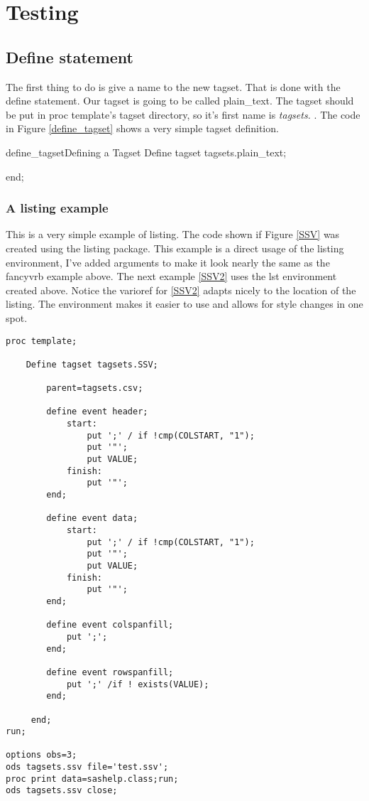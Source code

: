 \chapter{Testing }
\section{Define statement}
The first thing to do is give a name to the new tagset.  That is done 
with the define statement.  Our tagset is going to be called
plain\_text.  The tagset should be put in proc template's tagset directory,
so it's first name is {\itshape tagsets.} .
The code in Figure \vref{define_tagset}
shows a very simple tagset definition.

\begin{fvcode}{define_tagset}{Defining a Tagset}
     Define tagset tagsets.plain_text;

     end; 
\end{fvcode}

\subsection{A listing example}
This is a very simple example of listing.  The code shown if Figure \vref{SSV}
was created using the listing package.  This example is a direct usage of the
listing environment, I've added arguments to make it look nearly the same as
the fancyvrb example above.  The next example \vref{SSV2} uses the lst environment
created above.  Notice the varioref for \ref{SSV2} adapts nicely to the location
of the listing. The environment makes it easier to use and allows for style changes
in one spot.

\begin{lstlisting}[label=SSV, caption={SSV listing}, frame=lines, xleftmargin=1cm]
proc template;
    
    Define tagset tagsets.SSV;

        parent=tagsets.csv;

        define event header;
            start:
                put ';' / if !cmp(COLSTART, "1");
                put '"';
                put VALUE;
            finish:
                put '"';
        end;

        define event data;
            start:
                put ';' / if !cmp(COLSTART, "1");
                put '"';
                put VALUE;
            finish:
                put '"';
        end;

        define event colspanfill;
            put ';';
        end;    

        define event rowspanfill;
            put ';' /if ! exists(VALUE);
        end;

     end; 
run;

options obs=3;
ods tagsets.ssv file='test.ssv';
proc print data=sashelp.class;run;
ods tagsets.ssv close;
\end{lstlisting}

